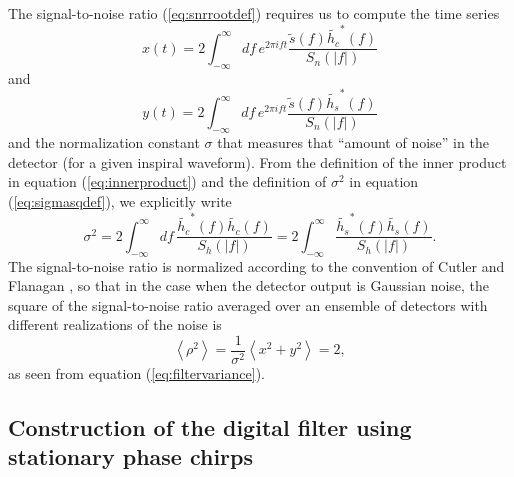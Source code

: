 The signal-to-noise ratio (\ref{eq:snrrootdef}) requires us to compute
the time series
\begin{equation}
\label{eq:xcts}
x(t) = 2 \int_{-\infty}^{\infty}df\,e^{2\pi i f t} 
\frac{\tilde{s}(f) \tilde{h_c}^\ast(f)}{S_n\left(\left|f\right|\right)}
\end{equation}
and
\begin{equation}
\label{eq:ycts}
y(t) = 2 \int_{-\infty}^{\infty}df\,e^{2\pi i f t} 
\frac{\tilde{s}(f) \tilde{h_s}^\ast(f)}{S_n\left(\left|f\right|\right)}
\end{equation}
and the normalization constant $\sigma$ that measures that ``amount of noise''
in the detector (for a given inspiral waveform). From the definition of the
inner product in equation (\ref{eq:innerproduct}) and the definition of
$\sigma^2$ in equation (\ref{eq:sigmasqdef}), we explicitly write
\begin{equation}
\label{eq:sigmasqcts}
\sigma^2 = 2 \int_{-\infty}^{\infty}df\,
\frac{\tilde{h_c}^\ast(f)\tilde{h_c}(f)}{S_h\left(\left|f\right|\right)} 
= 2 \int_{-\infty}^\infty 
\frac{\tilde{h_s}^\ast(f)\tilde{h_s}(f)}{S_h\left(\left|f\right|\right)}.
\end{equation}
The signal-to-noise ratio is normalized according to the convention
of Cutler and Flanagan \cite{Cutler:1994}, so that in the case when the detector
output is Gaussian noise, the square of the signal-to-noise ratio averaged
over an ensemble of detectors with different realizations of the noise is
\begin{equation}
\left\langle \rho^2 \right\rangle = 
\frac{1}{\sigma^2} \left\langle x^2 + y^2 \right\rangle = 2,
\end{equation}
as seen from equation (\ref{eq:filtervariance}).

\subsection{Construction of the digital filter using stationary phase chirps}
\label{ss:digitalfilter}

